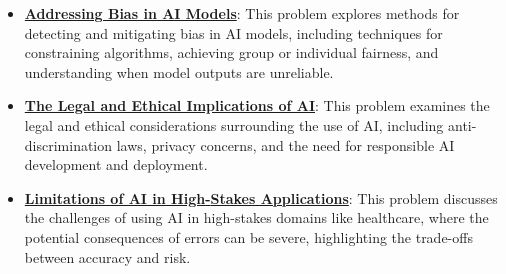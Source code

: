 \documentclass{article}%
\begin{document}
\begin{itemize}[leftmargin=*]
\item \href{https://purdue.brightspace.com/d2l/common/assets/pdfjs-d2l-dist/1.0.14-legacy/web/viewer.html?file=%2Fcontent%2Fenforced%2F1095467-wl.202510.CS.24300.001%2F16L2-ethics.pdf%3Fou%3D1095467&lang=en-us&container=d2l-fileviewer-rendered-pdf&fullscreen=d2l-fileviewer-rendered-pdf-dialog&height=667#page=24}{\textbf{Addressing Bias in AI Models}}: This problem explores methods for detecting and mitigating bias in AI models, including techniques for constraining algorithms, achieving group or individual fairness, and understanding when model outputs are unreliable.%
\item \href{https://purdue.brightspace.com/d2l/common/assets/pdfjs-d2l-dist/1.0.14-legacy/web/viewer.html?file=%2Fcontent%2Fenforced%2F1095467-wl.202510.CS.24300.001%2F16L2-ethics.pdf%3Fou%3D1095467&lang=en-us&container=d2l-fileviewer-rendered-pdf&fullscreen=d2l-fileviewer-rendered-pdf-dialog&height=667#page=9}{\textbf{The Legal and Ethical Implications of AI}}: This problem examines the legal and ethical considerations surrounding the use of AI, including anti-discrimination laws, privacy concerns, and the need for responsible AI development and deployment.%
\item \href{https://purdue.brightspace.com/d2l/common/assets/pdfjs-d2l-dist/1.0.14-legacy/web/viewer.html?file=%2Fcontent%2Fenforced%2F1095467-wl.202510.CS.24300.001%2F16L2-ethics.pdf%3Fou%3D1095467&lang=en-us&container=d2l-fileviewer-rendered-pdf&fullscreen=d2l-fileviewer-rendered-pdf-dialog&height=667#page=32}{\textbf{Limitations of AI in High{-}Stakes Applications}}: This problem discusses the challenges of using AI in high-stakes domains like healthcare, where the potential consequences of errors can be severe, highlighting the trade-offs between accuracy and risk.%
\end{itemize}

%
\end{document}
